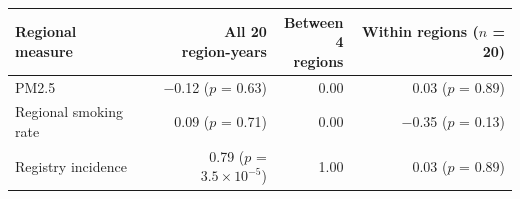 \begin{tabular}{lrrr}
\toprule
Regional measure & \makecell[b]{All 20\\{}region-years} & \makecell[b]{Between\\{}4 regions} & \makecell[b]{Within regions\\{}($n$ = 20)} \\
\midrule
PM2.5 & $-$0.12 ($p$ = 0.63) & 0.00 & 0.03 ($p$ = 0.89) \\
Regional smoking rate & 0.09 ($p$ = 0.71) & 0.00 & $-$0.35 ($p$ = 0.13) \\
Registry incidence & 0.79 ($p$ = $3.5\times10^{-5}$) & 1.00 & 0.03 ($p$ = 0.89) \\
\bottomrule
\end{tabular}
